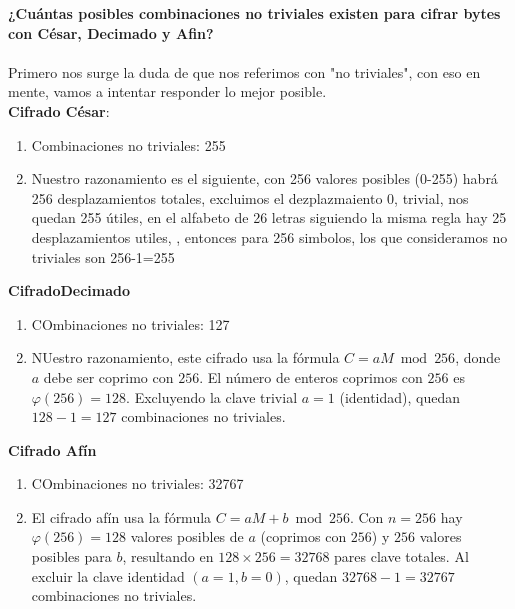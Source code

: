 \textbf{¿Cuántas posibles combinaciones no triviales existen para cifrar bytes con César, Decimado y Afin?}\\\\
Primero nos surge la duda de que nos referimos con "no triviales", con eso en mente, vamos a intentar responder lo mejor posible. \\
\textbf{Cifrado C\'esar}:
\begin{enumerate}
    \item Combinaciones no triviales: 255
    \item Nuestro razonamiento es el siguiente, con 256 valores posibles (0-255) habr\'a 256 desplazamientos totales, excluimos el dezplazmaiento 0, trivial, nos quedan 255 \'utiles, en el alfabeto de 26 letras siguiendo la misma regla hay 25 desplazamientos utiles, , entonces para 256 simbolos, los que consideramos no triviales son 256-1=255 \citep{dCOde}
\end{enumerate}
\textbf{CifradoDecimado}
\begin{enumerate}
    \item COmbinaciones no triviales: 127
    \item NUestro razonamiento, este cifrado usa la fórmula $C = aM \bmod 256$, donde $a$ debe ser coprimo con $256$. El número de enteros coprimos con $256$ es $\varphi(256)=128$. Excluyendo la clave trivial $a=1$ (identidad), quedan $128 - 1 = 127$ combinaciones no triviales. \citep{wikipedia_euler_totient_es}
\end{enumerate}
\textbf{Cifrado Af\'in}
\begin{enumerate}
    \item COmbinaciones no triviales: 32767
    \item El cifrado afín usa la fórmula $C = aM + b \bmod 256$. Con $n=256$ hay $\varphi(256)=128$ valores posibles de $a$ (coprimos con $256$) y $256$ valores posibles para $b$, resultando en $128 \times 256 = 32768$ pares clave totales. Al excluir la clave identidad $(a=1, b=0)$, quedan $32768 - 1 = 32767$ combinaciones no triviales.\citep{Course_SideKick}
\end{enumerate}
